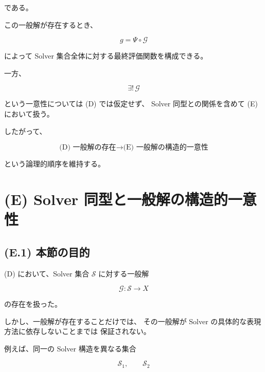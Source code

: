 \documentclass[a4paper,11pt]{article}
\newcommand{\Solver}{\mathcal{S}}
\begin{document}
である。

この一般解が存在するとき、

\begin{equation}
    g
    =
    \Psi\circ\mathcal{G}
\end{equation}

によって Solver 集合全体に対する最終評価関数を構成できる。

一方、

\begin{equation}
    \exists!\,
    \mathcal{G}
\end{equation}

という一意性については (D) では仮定せず、
Solver 同型との関係を含めて (E) において扱う。

したがって、

\begin{equation}
    \boxed{
        \text{(D) 一般解の存在}
        \longrightarrow
        \text{(E) 一般解の構造的一意性}
    }
\end{equation}

という論理的順序を維持する。


\section{(E) Solver 同型と一般解の構造的一意性}
\label{sec:E}

\subsection{(E.1) 本節の目的}
\label{subsec:E1}

(D) において、Solver 集合 $\Solver$ に対する一般解

\begin{equation}
    \mathcal{G}:
    \Solver
    \longrightarrow
    X
\end{equation}

の存在を扱った。

しかし、一般解が存在することだけでは、
その一般解が Solver の具体的な表現方法に依存しないことまでは
保証されない。

例えば、同一の Solver 構造を異なる集合

\begin{equation}
    \Solver_1,
    \qquad
    \Solver_2
\end{equation}
\end{document}
